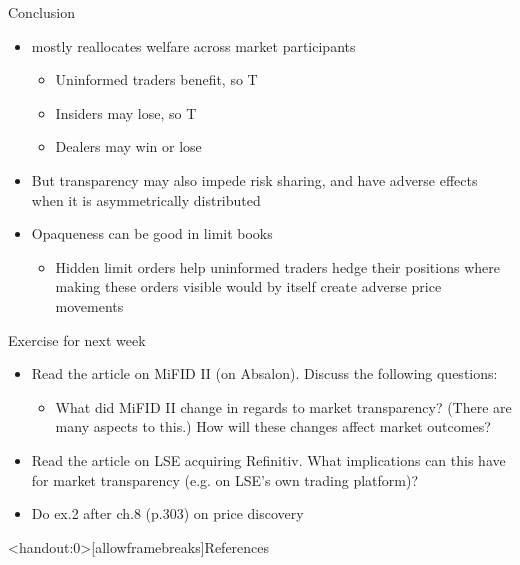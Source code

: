 \documentclass[english,10pt
,aspectratio=169
]{beamer}
\begin{document}
\begin{frame}{Conclusion}
	\begin{itemize}
		\item {} mostly reallocates welfare across market participants 
		\begin{itemize}
			\item Uninformed traders benefit, so T 
			\item Insiders may lose, so T 
			\item Dealers may win or lose
		\end{itemize}
		\item But transparency may also impede risk sharing, and have adverse effects when it is asymmetrically distributed
		\item Opaqueness can be good in limit books
		\begin{itemize}
			\item Hidden limit orders help uninformed traders hedge their positions where making these orders visible would by itself create adverse price movements
		\end{itemize}
	\end{itemize}
\end{frame}


\begin{frame}{Exercise for next week}
	\begin{itemize}
		\item Read the article on MiFID II (on Absalon). Discuss the following questions:
		\begin{itemize}
			\item What did MiFID II change in regards to market transparency? (There are many aspects to this.) How will these changes affect market outcomes?
		\end{itemize}
		\item Read the article on LSE acquiring Refinitiv. What implications can this have for market transparency (e.g. on LSE's own trading platform)?
		\item Do ex.2 after ch.8 (p.303) on price discovery
	\end{itemize}
\end{frame}


\appendix
\begin{frame}<handout:0>[allowframebreaks]{References}
	
	
\end{frame}
\end{document}
